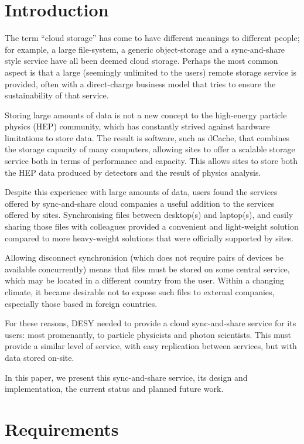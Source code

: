\documentclass[a4paper]{jpconf}
\begin{document}
\section{Introduction}

The term ``cloud storage'' has come to have different meanings to
different people; for example, a large file-system, a generic
object-storage and a sync-and-share style service have all been deemed
cloud storage.  Perhaps the most common aspect is that a large
(seemingly unlimited to the users) remote storage service is provided,
often with a direct-charge business model that tries to ensure the
sustainability of that service.

Storing large amounts of data is not a new concept to the high-energy
particle physics (HEP) community, which has constantly strived against
hardware limitations to store data.  The result is software, such as
dCache\cite{dcache}, that combines the storage capacity of many
computers, allowing sites to offer a scalable storage service both in
terms of performance and capacity.  This allows sites to store both
the HEP data produced by detectors and the result of physics analysis.

Despite this experience with large amounts of data, users found the
services offered by sync-and-share cloud companies a useful addition
to the services offered by sites.  Synchronising files between
desktop(s) and laptop(s), and easily sharing those files with
colleagues provided a convenient and light-weight solution compared to
more heavy-weight solutions that were officially supported by sites.

Allowing disconnect synchronision (which does not require pairs of
devices be available concurrently) means that files must be stored on
some central service, which may be located in a different country from
the user.  Within a changing climate, it became desirable not to
expose such files to external companies, especially those based in
foreign countries.

For these reasons, DESY needed to provide a cloud sync-and-share
service for its users: most promenantly, to particle physicists and
photon scientists.  This must provide a similar level of service, with
easy replication between services, but with data stored on-site.

In this paper, we present this sync-and-share service, its design and
implementation, the current status and planned future work.

\section{Requirements}
\end{document}
